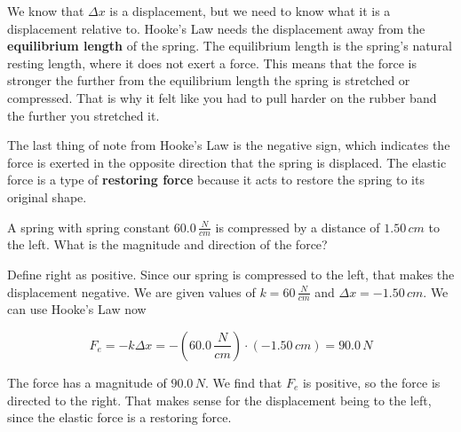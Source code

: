 \documentclass[12pt]{book}
\begin{document}
We know that $\Delta x$ is a displacement, but we need to know what it is a displacement relative to. Hooke's Law needs the displacement away from the \textbf{equilibrium length} of the spring. The equilibrium length is the spring's natural resting length, where it does not exert a force. This means that the force is stronger the further from the equilibrium length the spring is stretched or compressed. That is why it felt like you had to pull harder on the rubber band the further you stretched it.

The last thing of note from Hooke's Law is the negative sign, which indicates the force is exerted in the opposite direction that the spring is displaced. The elastic force is a type of \textbf{restoring force} because it acts to restore the spring to its original shape.

\begin{exampleblock}

A spring with spring constant $60.0 \, \frac{N}{cm}$ is compressed by a distance of $1.50 \, cm$ to the left. What is the magnitude and direction of the force?

\hspace{10pt}

Define right as positive. Since our spring is compressed to the left, that makes the displacement negative. We are given values of $k = 60 \, \frac{N}{cm}$ and $\Delta x = - 1.50 \, cm$. We can use Hooke's Law  now

\begin{equation}
F_e = -k \Delta x = -(60.0 \, \frac{N}{cm}) \cdot (-1.50 \, cm) = 90.0 \, N
\end{equation}

The force has a magnitude of $90.0 \, N$. We find that $F_e$ is positive, so the force is directed to the right. That makes sense for the displacement being to the left, since the elastic force is a restoring force.

\end{exampleblock}
\end{document}
